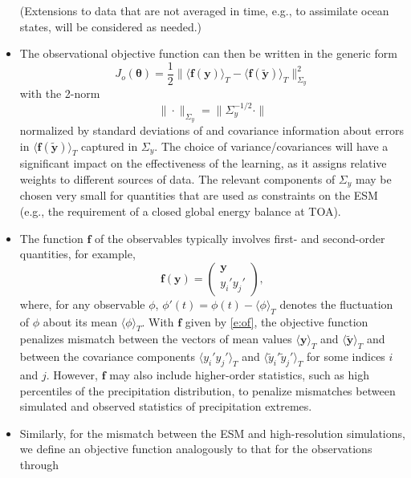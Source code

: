 \documentclass{article}
\renewcommand{\vec}[1]{\boldsymbol{{#1}}}
\begin{document}
\begin{itemize}
    (Extensions to data that are not averaged in time, e.g., to assimilate ocean states, will be considered as needed.) 
    \item The observational objective function can then be written in the generic form
    \begin{equation}\label{e:obj_o}
    J_o(\vec{\theta})=\frac{1}{2}\| \langle \vec{f}(\vec{y})  \rangle_T - \langle \vec{f}(\vec{\tilde y})
    \rangle_T \|_{\Sigma_y}^2
    \end{equation}
    with the 2-norm
    \begin{equation}
    \|\cdot\|_{\Sigma_y}=\|\Sigma_y^{-1/2}\cdot\|
    \end{equation}
    normalized by standard deviations of and covariance information about errors in $\langle \vec{f}(\vec{\tilde y}) \rangle_T$ captured in $\Sigma_y$. The choice of variance/covariances will have a significant impact on the effectiveness of the learning, as it assigns relative weights to different sources of data. The relevant components of $\Sigma_y$ may be chosen very small for quantities that are used as constraints on the ESM (e.g., the requirement of a closed global energy balance at TOA).
    \item The function $\vec{f}$ of the observables typically involves first- and second-order quantities, for example,
    \begin{equation}
    \vec{f}(\vec{y}) = \left( 
    \begin{array}{c} 
    \vec{y}\\
    y_i' y_j'
    \end{array}
    \right),
    \label{e:of}
    \end{equation}
    where, for any observable $\phi$, $\phi'(t) = \phi(t) - \langle \phi \rangle_T$ denotes the fluctuation of $\phi$ about its mean $\langle \phi \rangle_T$. With $\vec{f}$ given by \eqref{e:of}, the objective function penalizes mismatch between the vectors of mean values $\langle \vec{y} \rangle_T$ and $\langle \vec{\tilde y}\rangle_T$ and between the covariance components $\langle y_i' y_j' \rangle_T$ and  $\langle \tilde y_i' \tilde y_j' \rangle_T$ for some indices $i$ and $j$. However, $\vec{f}$ may also include higher-order statistics, such as high percentiles of the precipitation distribution, to penalize mismatches between simulated and observed statistics of precipitation extremes. 
    \item Similarly, for the mismatch between the ESM and high-resolution simulations, we define an objective function analogously to that for the observations through

\end{itemize}
\end{document}
